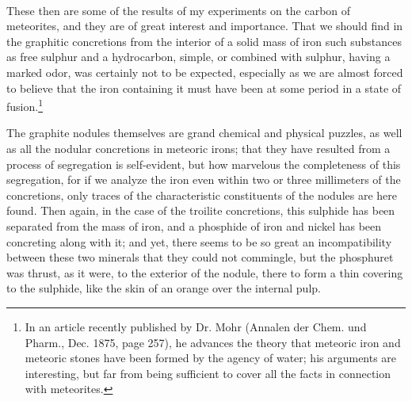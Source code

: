\documentclass[a4paper, 11pt, oneside, english]{article}
\begin{document}
\paragraph{}
These then are some of the results of my experiments on the carbon of meteorites, and they are of great interest and importance. That we should find in the graphitic concretions from the interior of a solid mass of iron such substances as free sulphur and a hydrocarbon, simple, or combined with sulphur, having a marked odor, was certainly not to be expected, especially as we are almost forced to believe that the iron containing it must have been at some period in a state of fusion.\footnote{In an article recently published by Dr. Mohr (Annalen der Chem. und Pharm., Dec. 1875, page 257), he advances the theory that meteoric iron and meteoric stones have been formed by the agency of water; his arguments are interesting, but far from being sufficient to cover all the facts in connection with meteorites.}

The graphite nodules themselves are grand chemical and physical puzzles, as well as all the nodular concretions in meteoric irons; that they have resulted from a process of segregation is self-evident, but how marvelous the completeness of this segregation, for if we analyze the iron even within two or three millimeters of the concretions, only traces of the characteristic constituents of the nodules are here found. Then again, in the case of the troilite concretions, this sulphide has been separated from the mass of iron, and a phosphide of iron and nickel has been concreting along with it; and yet, there seems to be so great an incompatibility between these two minerals that they could not commingle, but the phosphuret was thrust, as it were, to the exterior of the nodule, there to form a thin covering to the sulphide, like the skin of an orange over the internal pulp.
\end{document}
